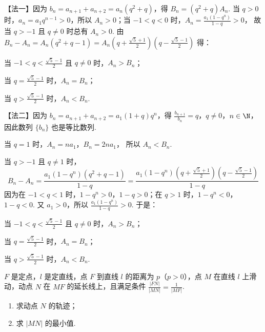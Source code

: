 \begin{solution}
【法一】因为 \(b_n=a_{n+1}+a_{n+2}=a_n(q^2+q)\)，得 \(B_n=(q^2+q)A_n\).
当 \(q>0\) 时，\(a_n=a_1q^{n-1}>0\)，所以 \(A_n>0\)；当 \(-1<q<0\) 时，\(A_n=\frac{a_1(1-q^n)}{1-q}>0\)，
故当 \(q>-1\) 且 \(q\neq 0\) 时总有 \(A_n>0\). 由 \(B_n-A_n=A_n(q^2+q-1)=A_n\left( q+\frac{\sqrt{5}+1}{2} \right)\left( q-\frac{\sqrt{5}-1}{2} \right)\) 得：

当 \(-1<q<\frac{\sqrt{5}-1}{2}\) 且 \(q\neq 0\) 时，\(A_n>B_n\)；

当 \(q=\frac{\sqrt{5}-1}{2}\) 时，\(A_n=B_n\)；

当 \(q>\frac{\sqrt{5}-1}{2}\) 时，\(A_n<B_n\).

【法二】因为 \(b_n=a_{n+1}+a_{n+2}=a_1(1+q)q^n\)，得 \(\frac{b_{n+1}}{b_n}=q\)，\(q\neq 0\)，\(n\in \N\)，
因此数列 \(\{b_n\}\) 也是等比数列.

当 \(q=1\) 时，\(A_n=na_1\)，\(B_n=2na_1\)，
所以 \(A_n<B_n\).

当 \(q>-1\) 且 \(q\neq 1\) 时，
\[
B_n-A_n=\frac{a_1(1-q^n)(q^2+q-1)}{1-q}
=\frac{a_1(1-q^n)\left( q+\frac{\sqrt{5}+1}{2} \right)\left( q-\frac{\sqrt{5}-1}{2} \right)}{1-q}
\]
因为在 \(-1<q<1\) 时，\(1-q^n>0\)，\(1-q>0\)；在 \(q>1\) 时，\(1-q^n<0\)，\(1-q<0\). 又 \(a_1>0\)，所以 \(\frac{a_1(1-q^n)}{1-q}>0\). 于是：

当 \(-1<q<\frac{\sqrt{5}-1}{2}\) 且 \(q\neq 0\) 时，\(A_n>B_n\)；

当 \(q=\frac{\sqrt{5}-1}{2}\) 时，\(A_n=B_n\)；

当 \(q>\frac{\sqrt{5}-1}{2}\) 时，\(A_n<B_n\).
\end{solution}

\begin{problem}
\(F\) 是定点，\(l\) 是定直线，点 \(F\) 到直线 \(l\) 的距离为 \(p\)（\(p>0\)），点 \(M\) 在直线 \(l\) 上滑动，动点 \(N\) 在 \(MF\) 的延长线上，且满足条件 \(\frac{|FN|}{|MN|}=\frac{1}{|MF|}\).
\begin{enumerate}
\item 求动点 \(N\) 的轨迹；
\item 求 \(|MN|\) 的最小值.
\end{enumerate}
\end{problem}

